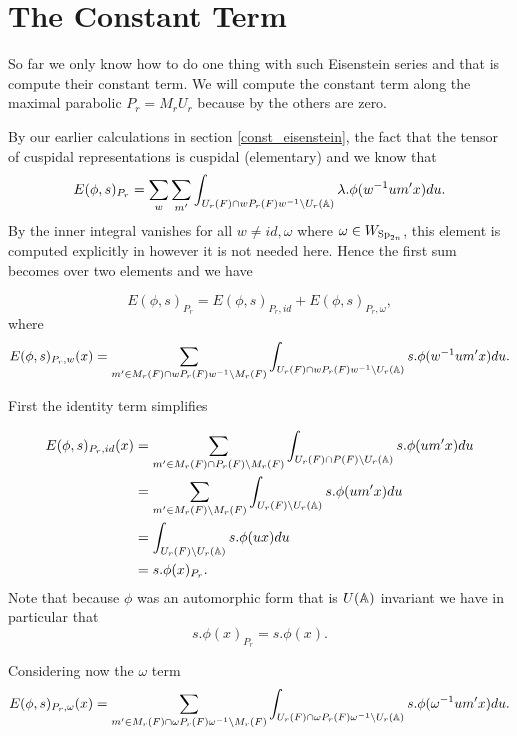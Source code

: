 \section{The Constant Term}
So far we only know how to do one thing with such Eisenstein series and that is compute their constant term. We will compute the constant term along the maximal parabolic \(P_r = M_rU_r\) because by \cite[II.1.7 (ii)]{moeglinSpectralDecompositionEisenstein1995} the others are zero.

By our earlier calculations in section \ref{const_eisenstein}, the fact that the tensor of cuspidal representations is cuspidal (elementary) and \cite{jiangPolesCertainResidual2013} we know that 
     \[E(\phi, s)_{P_r} = \sum_{ w} \sum_{m'} \int_{U_r(F)\cap wP_r(F)w\inv \setminus U_r(\A)} \lambda.\phi( w\inv um' x)  du.\] 
     By \cite{jiangPolesCertainResidual2013} the inner integral vanishes for all \(w\neq id, \omega\) where \(\omega\in W_{\operatorname{Sp}_{2n}}\), this element is computed explicitly in \cite{ginzburgDescentMapAutomorphic2011} however it is not needed here. Hence the first sum becomes over two elements and we have 

     \[E(\phi, s)_{P_r} = E(\phi, s)_{P_r, id} + E(\phi, s)_{P_r, \omega},\]
     where 
     \[E(\phi, s)_{P_r, w}(x) =  \sum_{m'\in M_r(F)\cap wP_r(F)w\inv\setminus M_r(F)} \int_{U_r(F)\cap wP_r(F)w\inv \setminus U_r(\A)} s.\phi( w\inv um' x)  du.\]

First the identity term simplifies

     \begin{equation*}
        \begin{aligned}
            E(\phi, s)_{P_r, id} (x)&=  \sum_{m'\in M_r(F)\cap P_r(F)\setminus M_r(F)} \int_{U_r(F)\cap P(F) \setminus U_r(\A)} s.\phi( um' x)  du\\
            &= \sum_{m'\in M_r(F)\setminus M_r(F)} \int_{U_r(F)\setminus U_r(\A)} s.\phi( um' x)  du \\
            &=\int_{U_r(F)\setminus U_r(\A)} s.\phi( u x)  du \\
            &= s.\phi(x)_{P_r}.
        \end{aligned}
     \end{equation*}
     Note that because \(\phi\) was an automorphic form that is \(U(\A)\) invariant we have in particular that 
     \[s.\phi(x)_{P_r} = s.\phi(x).\]

     Considering now the \(\omega\) term 
     \[E(\phi, s)_{P_r, \omega}(x) =  \sum_{m'\in M_r(F)\cap \omega P_r(F)\omega\inv\setminus M_r(F)} \int_{U_r(F)\cap \omega P_r(F)\omega\inv \setminus U_r(\A)} s.\phi( \omega\inv um' x)  du.\]


